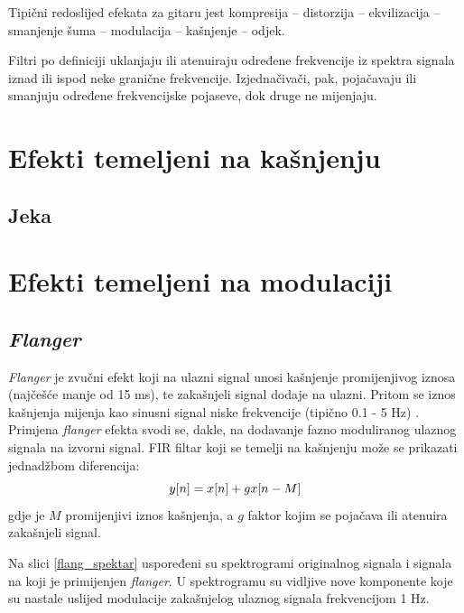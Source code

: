 \documentclass[conference]{IEEEtran}
\begin{document}
Tipični redoslijed efekata za gitaru \cite{b1} jest kompresija – distorzija – ekvilizacija – smanjenje šuma
– modulacija – kašnjenje – odjek.

Filtri po definiciji uklanjaju ili atenuiraju određene frekvencije iz spektra signala iznad
ili ispod neke granične frekvencije. Izjednačivači, pak, pojačavaju ili smanjuju određene frekvencijske
pojaseve, dok druge ne mijenjaju.

\section{Efekti temeljeni na kašnjenju}

\subsection{Jeka}

\section{Efekti temeljeni na modulaciji}

\subsection{\textit{Flanger}}

\textit{Flanger} je zvučni efekt koji na ulazni signal unosi kašnjenje promijenjivog iznosa (najčešće manje
od 15 ms), te zakašnjeli signal dodaje na ulazni. Pritom se iznos kašnjenja mijenja kao sinusni signal 
niske frekvencije (tipično 0.1 - 5 Hz) \citep{b1}. Primjena \textit{flanger} efekta svodi se, dakle, na 
dodavanje fazno moduliranog ulaznog signala na izvorni signal. FIR filtar koji se temelji na kašnjenju može
se prikazati jednadžbom diferencija:
\begin{equation}
	y[n]=x[n]+g\*x[n-M]
	\label{flanger}
\end{equation}
gdje je $M$ promijenjivi iznos kašnjenja, a $g$ faktor kojim se pojačava ili atenuira zakašnjeli signal.  

Na slici \ref{flang_spektar} uspoređeni su spektrogrami originalnog signala i signala na koji je 
primijenjen \textit{flanger}. U spektrogramu su vidljive nove komponente koje su nastale uslijed modulacije
zakašnjelog ulaznog signala frekvencijom 1 Hz. 
\end{document}
